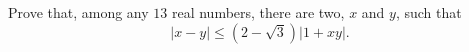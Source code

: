 Prove that, among any $13$ real numbers, there are two, $x$ and $y$, such that
\[ |x - y| \leq (2 - \sqrt{3})|1 + xy|. \]
